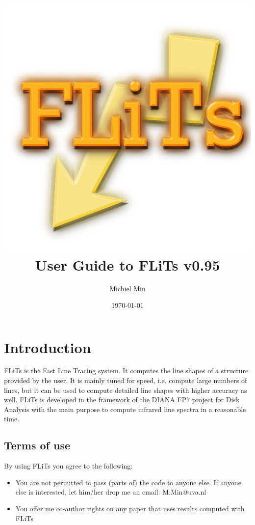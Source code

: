 \documentclass[12pt]{article}
\begin{document}
\title{\includegraphics[width=0.9\hsize]{Logo_FLiTs}\\User Guide to FLiTs v0.95}
\author{Michiel Min}
\date{\today}
\maketitle

\section{Introduction}

FLiTs is the Fast Line Tracing system. It computes the line shapes of a structure provided by the user. It is mainly tuned for speed, i.e. compute large numbers of lines, but it can be used to compute detailed line shapes with higher accuracy as well. FLiTs is developed in the framework of the DIANA FP7 project for Disk Analysis with the main purpose to compute infrared line spectra in a reasonable time.

\subsection{Terms of use}

By using FLiTs you agree to the following:
\begin{itemize}
\item You are not permitted to pass (parts of) the code to anyone else. If anyone else is interested, let him/her drop me an email: M.Min@uva.nl
\item You offer me co-author rights on any paper that uses results computed with FLiTs
\end{itemize}
\end{document}
